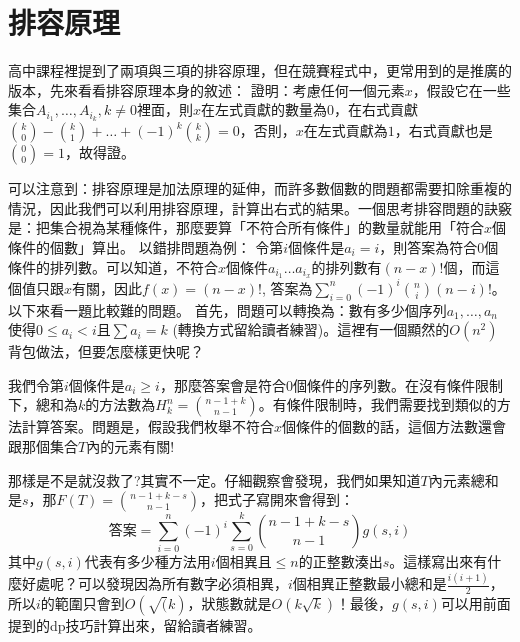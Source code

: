 \documentclass[main.tex]{subfiles}
\begin{document}
\section{排容原理}
高中課程裡提到了兩項與三項的排容原理，但在競賽程式中，更常用到的是推廣的版本，先來看看排容原理本身的敘述：
證明：考慮任何一個元素$x$，假設它在一些集合$A_{i_1}, \dots, A_{i_k}, k \neq 0$裡面，則$x$在左式貢獻的數量為$0$，在右式貢獻$\binom{k}{0} - \binom{k}{1} + \dots + (-1)^{k}\binom{k}{k} = 0$，否則，$x$在左式貢獻為$1$，右式貢獻也是$\binom{0}{0} = 1$，故得證。
\\
\par 可以注意到：排容原理是加法原理的延伸，而許多數個數的問題都需要扣除重複的情況，因此我們可以利用排容原理，計算出右式的結果。一個思考排容問題的訣竅是：把集合視為某種條件，那麼要算「不符合所有條件」的數量就能用「符合$x$個條件的個數」算出。
以錯排問題為例：
令第$i$個條件是$a_i = i$，則答案為符合$0$個條件的排列數。可以知道，不符合$x$個條件$a_{i_1} \dots a_{i_x}$的排列數有$(n-x)!$個，而這個值只跟$x$有關，因此$f(x) = (n-x)!$, 答案為$\sum_{i=0}^n (-1)^i \binom{n}{i}(n-i)!$。\\

以下來看一題比較難的問題。
首先，問題可以轉換為：數有多少個序列$a_1, \dots, a_n$使得$0 \leq a_i < i$且$\sum a_i = k$ (轉換方式留給讀者練習)。這裡有一個顯然的$O(n^2)$背包做法，但要怎麼樣更快呢？
\par 我們令第$i$個條件是$a_i \geq i$，那麼答案會是符合$0$個條件的序列數。在沒有條件限制下，總和為$k$的方法數為$H_k^n = \binom{n-1+k}{n-1}$。有條件限制時，我們需要找到類似的方法計算答案。問題是，假設我們枚舉不符合$x$個條件的個數的話，這個方法數還會跟那個集合$T$內的元素有關!
\par 那樣是不是就沒救了?其實不一定。仔細觀察會發現，我們如果知道$T$內元素總和是$s$，那$F(T) = \binom{n-1+k-s}{n-1}$，把式子寫開來會得到：
\[\textbf{答案} = \sum_{i=0}^n (-1)^{i} \sum_{s=0}^k\binom{n-1+k-s}{n-1} g(s, i) \]
其中$g(s, i)$代表有多少種方法用$i$個相異且$\leq n$的正整數湊出$s$。這樣寫出來有什麼好處呢？可以發現因為所有數字必須相異，$i$個相異正整數最小總和是$\frac{i(i+1)}{2}$，所以$i$的範圍只會到$O(\sqrt(k)$，狀態數就是$O(k\sqrt k)$！最後，$g(s, i)$可以用前面提到的dp技巧計算出來，留給讀者練習。
\end{document}
